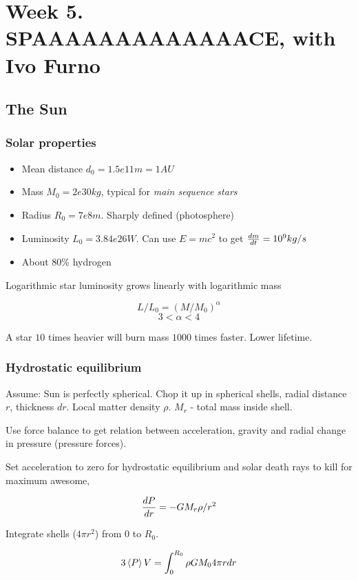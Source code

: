 \documentclass[PlasmaNotes.tex]{subfiles}
\begin{document}
\setcounter{section}{4}

\section{Week 5. SPAAAAAAAAAAAAACE, with Ivo Furno}

\subsection{The Sun}

\subsubsection{Solar properties}
\begin{itemize}
\item Mean distance $d_0 = 1.5e11 m = 1 AU$
\item Mass $M_0=2e30 kg$, typical for \emph{main sequence stars}
\item Radius $R_0 = 7e8 m$. Sharply defined (photosphere)
\item Luminosity $L_0=3.84e26 W$. Can use $E=mc^2$ to get $\frac{d m}{d t} = 10^9 kg/s$ 
\item About 80\% hydrogen
\end{itemize}

Logarithmic star luminosity grows linearly with logarithmic mass

\[ L/L_0 = (M/M_0)^{\alpha} \]
\[ 3 < \alpha < 4\]

A star $10$ times heavier will burn mass $1000$ times faster. Lower lifetime.

\subsubsection{Hydrostatic equilibrium}

Assume: Sun is perfectly spherical. Chop it up in spherical shells, radial distance $r$, thickness $dr$. Local matter density $\rho$. $M_r$ - total mass inside shell.

Use force balance to get relation between acceleration, gravity and radial change in pressure (pressure forces).

Set acceleration to zero for hydrostatic equilibrium and solar death rays to kill for maximum awesome, 

\[ \frac{d P}{d r} = - G M_r \rho /r^2 \]

Integrate shells ($4 \pi r^2$) from $0$ to $R_0$.

\[3 \left< P \right> V = \int_0^{R_0}{\rho G M_0 4 \pi r dr} \]
\end{document}
